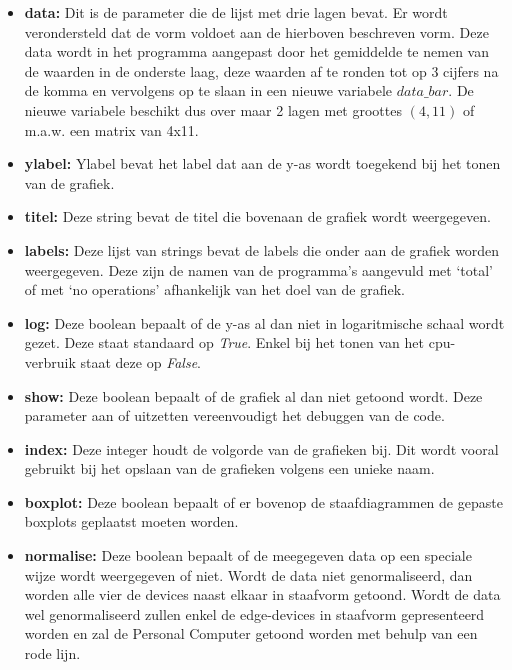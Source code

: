  	\begin{itemize}
 		\item \textbf{data:} Dit is de parameter die de lijst met drie lagen bevat. Er wordt verondersteld dat de vorm voldoet aan de hierboven beschreven vorm. Deze data wordt in het programma aangepast door het gemiddelde te nemen van de waarden in de onderste laag, deze waarden af te ronden tot op 3 cijfers na de komma en vervolgens op te slaan in een nieuwe variabele $data\_bar$. De nieuwe variabele beschikt dus over maar 2 lagen met groottes $(4,11)$ of m.a.w. een matrix van 4x11.
 		\item \textbf{ylabel:} Ylabel bevat het label dat aan de y-as wordt toegekend bij het tonen van de grafiek. 
 		\item \textbf{titel:} Deze string bevat de titel die bovenaan de grafiek wordt weergegeven.
 		\item \textbf{labels:} Deze lijst van strings bevat de labels die onder aan de grafiek worden weergegeven. Deze zijn de namen van de programma's aangevuld met `total' of met `no operations' afhankelijk van het doel van de grafiek.
 		\item \textbf{log:} Deze boolean bepaalt of de y-as al dan niet in logaritmische schaal wordt gezet. Deze staat standaard op \textit{True}. Enkel bij het tonen van het \gls{cpu}-verbruik staat deze op \textit{False}.
 		\item \textbf{show:} Deze boolean bepaalt of de grafiek al dan niet getoond wordt. Deze parameter aan of uitzetten vereenvoudigt het debuggen van de code.
 		\item \textbf{index:} Deze integer houdt de volgorde van de grafieken bij. Dit wordt vooral gebruikt bij het opslaan van de grafieken volgens een unieke naam.
 		\item \textbf{boxplot:} Deze boolean bepaalt of er bovenop de staafdiagrammen de gepaste boxplots geplaatst moeten worden. 
 		\item \textbf{normalise:} Deze boolean bepaalt of de meegegeven data op een speciale wijze wordt weergegeven of niet. Wordt de data niet genormaliseerd, dan worden alle vier de devices naast elkaar in staafvorm getoond. Wordt de data wel genormaliseerd zullen enkel de edge-devices in staafvorm gepresenteerd worden en zal de Personal Computer getoond worden met behulp van een rode lijn. 
 	\end{itemize}
 	

